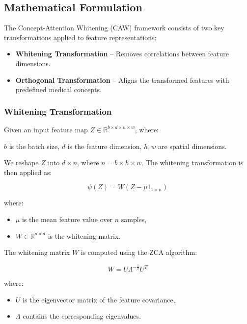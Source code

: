 \documentclass[a4paper,11pt]{article}
\begin{document}
\subsection{Mathematical Formulation}

The Concept-Attention Whitening (CAW) framework consists of two key transformations applied to feature representations: 

\begin{itemize}
    \item \textbf{Whitening Transformation} – Removes correlations between feature dimensions.
    \item \textbf{Orthogonal Transformation} – Aligns the transformed features with predefined medical concepts.
\end{itemize}

\subsubsection{Whitening Transformation}
Given an input feature map \( Z \in \mathbb{R}^{b \times d \times h \times w} \), where:

\( b \) is the batch size, \( d \) is the feature dimension, \( h, w \) are spatial dimensions.

We reshape \( Z \) into \( d \times n \), where \( n = b \times h \times w \).  
The whitening transformation is then applied as:

\begin{equation}
    \psi(Z) = W (Z - \mu 1_{1 \times n})
\end{equation}

where:
\begin{itemize}
    \item \( \mu \) is the mean feature value over \( n \) samples,
    \item \( W \in \mathbb{R}^{d \times d} \) is the whitening matrix.
\end{itemize}

The whitening matrix \( W \) is computed using the ZCA \cite{huang2019iterative} algorithm:

\begin{equation}
    W = U \Lambda^{-\frac{1}{2}} U^T
\end{equation}

where:
\begin{itemize}
    \item \( U \) is the eigenvector matrix of the feature covariance,
    \item \( \Lambda \) contains the corresponding eigenvalues.
\end{itemize}
\end{document}
